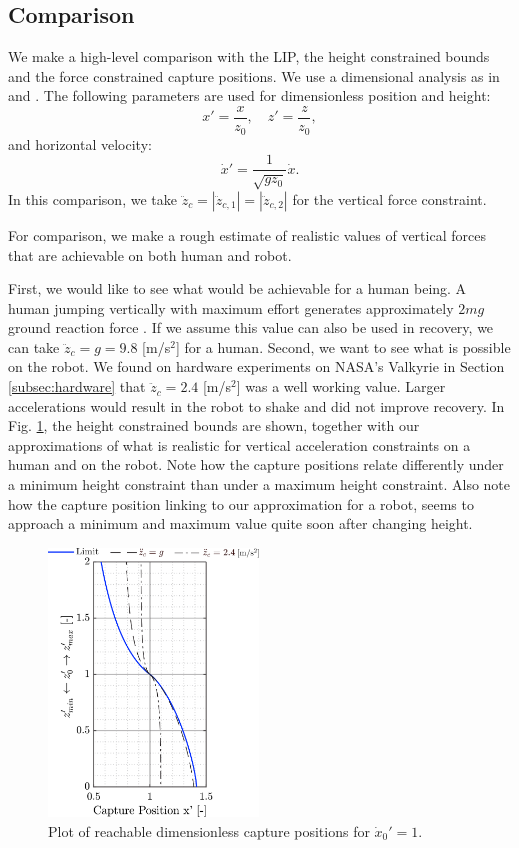 \documentclass[letterpaper, 10 pt, conference]{ieeeconf}  %
\newcommand{\ddzc}{\ddot{z}_{c}}
\newcommand{\ddzcf}{\ddot{z}_{c,1}}
\newcommand{\ddzcs}{\ddot{z}_{c,2}}
\begin{document}
\subsection{Comparison}\label{sec:comparison}
We make a high-level comparison with the LIP, the height constrained bounds and the force constrained capture positions. We use a dimensional analysis as in \cite{pratt2006capture,stephens2007humanoid} and \cite{koolen2012capturability}. The following parameters are used for dimensionless position and height:
\begin{equation}
	x' = \frac{x}{z_0}, \quad z' = \frac{z}{z_0},
\end{equation}
and horizontal velocity:
\begin{equation}
 \dot{x}' = \frac{1}{\sqrt{gz_0}}\dot{x}.
\end{equation}
In this comparison, we take $\ddzc=|\ddzcf|=|\ddzcs|$ for the vertical force constraint.

For comparison, we make a rough estimate of realistic values of vertical forces that are achievable on both human and robot.

First, we would like to see what would be achievable for a human being. A human jumping vertically with maximum effort generates approximately $2mg$ ground reaction force \cite{linthorne2001analysis}. If we assume this value can also be used in recovery, we can take $\ddot{z}_c=g=9.8$ [m/s$^2$] for a human. Second, we want to see what is possible on the robot. We found on hardware experiments on NASA's Valkyrie in Section \ref{subsec:hardware} that $\ddot{z}_c=2.4$ [m/s$^2$] was a well working value. Larger accelerations would result in the robot to shake and did not improve recovery. In Fig. \ref{fig:caplimits}, the height constrained bounds are shown, together with our approximations of what is realistic for vertical acceleration constraints on a human and on the robot. Note how the capture positions relate differently under a minimum height constraint than under a maximum height constraint. Also note how the capture position linking to our approximation for a robot, seems to approach a minimum and maximum value quite soon after changing height.
\begin{figure}
      \centering
      \includegraphics[width=2.2in]{caplimits.png}
      \caption{Plot of reachable dimensionless capture positions for $\dot{x}_0'=1$. }
      \label{fig:caplimits}
\end{figure}
\end{document}
